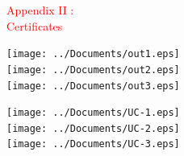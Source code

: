 \documentclass[a4paper]{article}
\begin{document}
\pagebreak

\textcolor{red}{\huge Appendix II : \hfill}\\
\vskip 0.2cm
\textcolor{red}{\Large Certificates}\\
\vskip 0.5cm


\texttt{[image: ../Documents/out1.eps]}\\

\texttt{[image: ../Documents/out2.eps]}\\

\texttt{[image: ../Documents/out3.eps]}


\pagebreak

\texttt{[image: ../Documents/UC-1.eps]}\\

\texttt{[image: ../Documents/UC-2.eps]}\\

\texttt{[image: ../Documents/UC-3.eps]}\\
\end{document}

